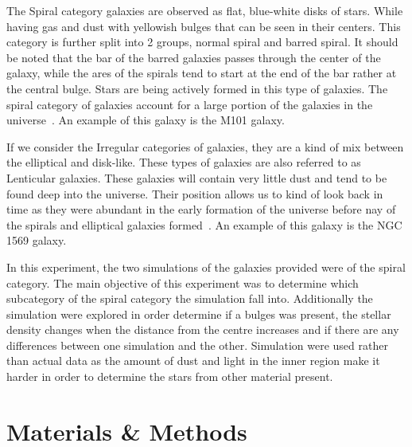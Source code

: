\documentclass[12pt, a4paper]{article}
\begin{document}
The Spiral category galaxies are observed as flat, blue-white disks of stars. While having gas and dust with yellowish bulges that can be seen in their centers. This category is further split into 2 groups, normal spiral and barred spiral. It should be noted that the bar of the barred galaxies passes through the center of the galaxy, while the ares of the spirals tend to start at the end of the bar rather at the central bulge. Stars are being actively formed in this type of galaxies. The spiral category of galaxies account for a large portion of the galaxies in the universe~\parencite{GALAXIES2023}. An example of this galaxy is the M101 galaxy.

If we consider the Irregular categories of galaxies, they are a kind of mix between the elliptical and disk-like. These types of galaxies are also referred to as Lenticular galaxies. These galaxies will contain very little dust and tend to be found deep into the universe. Their position allows us to kind of look back in time as they were abundant in the early formation of the universe before nay of the spirals and elliptical galaxies formed~\parencite{GALAXIES2023}. An example of this galaxy is the NGC 1569 galaxy. 

In this experiment, the two simulations of the galaxies provided were of the spiral category. The main objective of this experiment was to determine which subcategory of the spiral category the simulation fall into. Additionally the simulation were explored in order determine if a bulges was present, the stellar density changes when the distance from the centre increases and if there are any differences between one simulation and the other. Simulation were used rather than actual data as the amount of dust and light in the inner region make it harder in order to determine the stars from other material present.

\section{Materials \& Methods}
\end{document}
